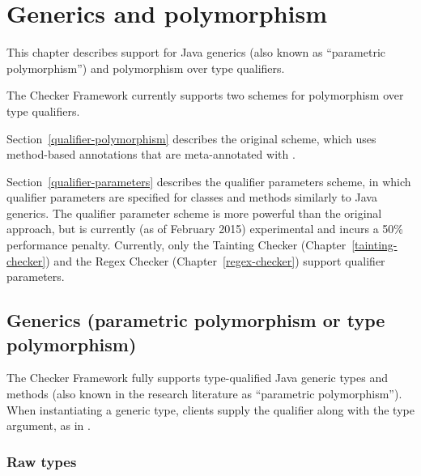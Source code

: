 \newcommand{\qp}[1]{\ensuremath{\langle\!\!\langle}#1\ensuremath{\rangle\!\!\rangle}}

\htmlhr
\chapter{Generics and polymorphism\label{polymorphism}}

This chapter describes support for Java generics (also known as
``parametric polymorphism'') and polymorphism over type qualifiers.

The Checker Framework currently supports two schemes for polymorphism over
type qualifiers.

Section~\ref{qualifier-polymorphism} describes the
original scheme, which uses method-based annotations that are meta-annotated
with .

Section~\ref{qualifier-parameters} describes the qualifier parameters
scheme, in which qualifier parameters are specified for classes and methods
similarly to Java generics.  
The qualifier
parameter scheme is more powerful than the original approach, but is
currently (as of February 2015)
experimental and incurs a
50\% performance penalty.
Currently, %
only the Tainting Checker
(Chapter~\ref{tainting-checker}) and the Regex Checker
(Chapter~\ref{regex-checker}) support qualifier parameters.


\section{Generics (parametric polymorphism or type polymorphism)\label{generics}}

The Checker Framework fully supports
type-qualified Java generic types and methods (also known in the research literature as ``parametric
polymorphism'').
When instantiating a generic type,
clients supply the qualifier along with the type argument, as in
.


\subsection{Raw types\label{generics-raw-types}}

